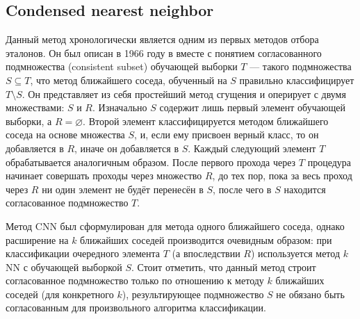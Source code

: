 \subsection{Condensed nearest neighbor}
Данный метод хронологически является одним из первых методов отбора эталонов. Он был описан в 1966 году в \cite{hart} вместе с понятием согласованного подмножества (consistent subset) обучающей выборки \(T\) --- такого подмножества \(S\subseteq T\), что метод ближайшего соседа, обученный на \(S\) правильно классифицирует \(T\setminus S\). Он представляет из себя простейший метод сгущения и оперирует с двумя множествами: \(S\) и \(R\). Изначально \(S\) содержит лишь первый элемент обучающей выборки, а \(R=\varnothing\). Второй элемент классифицируется методом ближайшего соседа на основе множества \(S\), и, если ему присвоен верный класс, то он добавляется в \(R\), иначе он добавляется в \(S\). Каждый следующий элемент \(T\) обрабатывается аналогичным образом. После первого прохода через \(T\) процедура начинает совершать проходы через множество \(R\), до тех пор, пока за весь проход через \(R\) ни один элемент не будёт перенесён в \(S\), после чего в \(S\) находится согласованное подмножество \(T\).

Метод CNN был сформулирован для метода одного ближайшего соседа, однако расширение на \(k\) ближайших соседей производится очевидным образом: при классификации очередного элемента \(T\) (а впоследствии \(R\)) используется метод \(k\)NN с обучающей выборкой \(S\). Стоит отметить, что данный метод строит согласованное подмножество только по отношению к методу \(k\) ближайших соседей (для конкретного \(k\)), результирующее подмножество \(S\) не обязано быть согласованным для произвольного алгоритма классификации.

